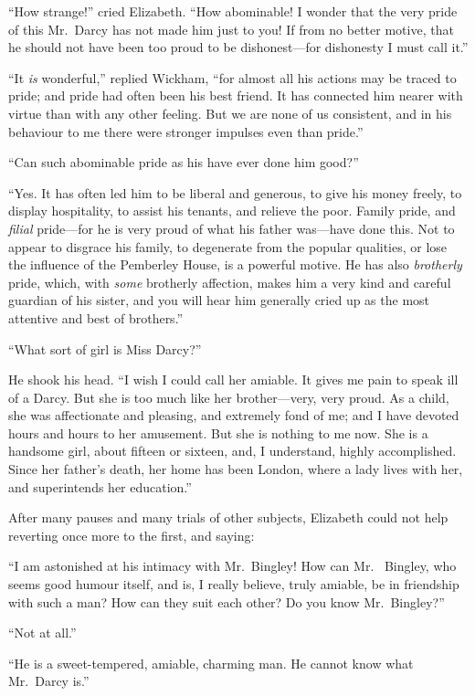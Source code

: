 ``How strange!'' cried Elizabeth.  ``How abominable!  I wonder
that the very pride of this Mr.\ Darcy has not made him just to
you!  If from no better motive, that he should not have been too
proud to be dishonest---for dishonesty I must call it.''

``It \emph{is} wonderful,'' replied Wickham, ``for almost all his actions
may be traced to pride; and pride had often been his best friend.
It has connected him nearer with virtue than with any other
feeling.  But we are none of us consistent, and in his behaviour
to me there were stronger impulses even than pride.''

``Can such abominable pride as his have ever done him good?''

``Yes.  It has often led him to be liberal and generous, to give his
money freely, to display hospitality, to assist his tenants, and
relieve the poor.  Family pride, and \emph{filial} pride---for he is very
proud of what his father was---have done this.  Not to appear to
disgrace his family, to degenerate from the popular qualities, or
lose the influence of the Pemberley House, is a powerful motive.
He has also \emph{brotherly} pride, which, with \emph{some} brotherly
affection, makes him a very kind and careful guardian of his
sister, and you will hear him generally cried up as the most
attentive and best of brothers.''

``What sort of girl is Miss Darcy?''

He shook his head.  ``I wish I could call her amiable.  It gives
me pain to speak ill of a Darcy.  But she is too much like her
brother---very, very proud.  As a child, she was affectionate
and pleasing, and extremely fond of me; and I have devoted hours
and hours to her amusement.  But she is nothing to me now.
She is a handsome girl, about fifteen or sixteen, and, I
understand, highly accomplished.  Since her father's death,
her home has been London, where a lady lives with her, and
superintends her education.''

After many pauses and many trials of other subjects, Elizabeth
could not help reverting once more to the first, and saying:

``I am astonished at his intimacy with Mr.\ Bingley!  How can Mr.\ %
Bingley, who seems good humour itself, and is, I really believe,
truly amiable, be in friendship with such a man?  How can they
suit each other?  Do you know Mr.\ Bingley?''

``Not at all.''

``He is a sweet-tempered, amiable, charming man.  He cannot
know what Mr.\ Darcy is.''


